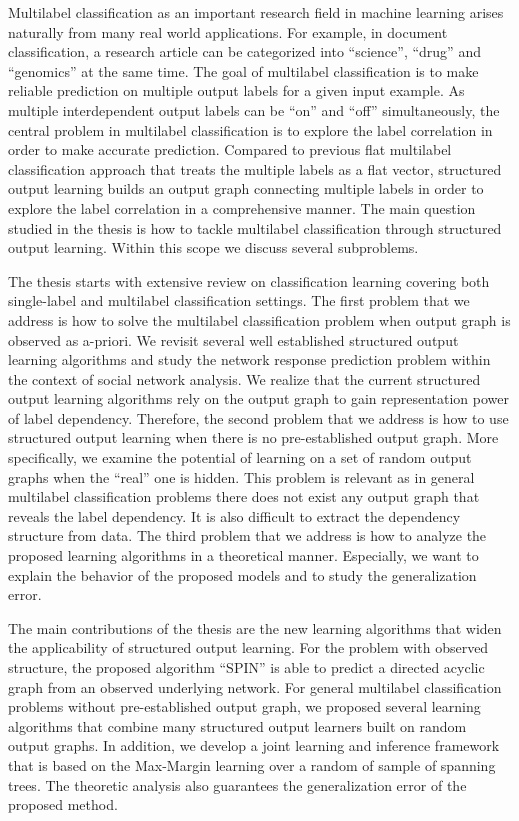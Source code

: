 \documentclass[10pt]{article}
\begin{document}
\setlength{\parindent}{3mm}
\small

\noindent Multilabel classification as an important research field in machine learning arises naturally from many real world applications. For example, in document classification, a research article can be categorized into ``science'', ``drug'' and ``genomics'' at the same time. The goal of multilabel classification is to make reliable prediction on multiple output labels for a given input example. As multiple interdependent output labels can be ``on'' and ``off'' simultaneously, the central problem in multilabel classification is to explore the label correlation in order to make accurate prediction. Compared to previous flat multilabel classification approach that treats the multiple labels as a flat vector, structured output learning builds an output graph connecting multiple labels in order to explore the label correlation in a comprehensive manner. The main question studied in the thesis is how to tackle multilabel classification through structured output learning. Within this scope we discuss several subproblems.

The thesis starts with extensive review on classification learning covering both single-label and multilabel classification settings. The first problem that we address is how to solve the multilabel classification problem when output graph is observed as a-priori. We revisit several well established structured output learning algorithms and study the network response prediction problem within the context of social network analysis. We realize that the current structured output learning algorithms rely on the output graph to gain representation power of label dependency. Therefore, the second problem that we address is how to use structured output learning when there is no pre-established output graph. More specifically, we examine the potential of learning on a set of random output graphs when the ``real'' one is hidden. This problem is relevant as in general multilabel classification problems there does not exist any output graph that reveals the label dependency. It is also difficult to extract the dependency structure from data. The third problem that we address is how to analyze the proposed learning algorithms in a theoretical manner. Especially, we want to explain the behavior of the proposed models and to study the generalization error.

The main contributions of the thesis are the new learning algorithms that widen the applicability of structured output learning. For the problem with observed structure, the proposed algorithm ``SPIN'' is able to predict a directed acyclic graph from an observed underlying network. For general multilabel classification problems without pre-established output graph, we proposed several learning algorithms that combine many structured output learners built on random output graphs. In addition, we develop a joint learning and inference framework that is based on the Max-Margin learning over a random of sample of spanning trees. The theoretic analysis also guarantees the generalization error of the proposed method.
\end{document}
